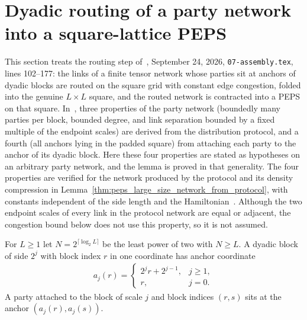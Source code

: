 \section{Dyadic routing of a party network into a square-lattice PEPS}
\label{sec:peps_dyadic_routing}
This section treats the routing step of~\cite[Lemma~8.2]{OpenAI2026PolynomialPEPS}, September 24, 2026,
\texttt{07-assembly.tex}, lines 102--177: the links of a finite tensor network
whose parties sit at anchors of dyadic blocks are routed on the square grid with
constant edge congestion, folded into the genuine $L\times L$ square, and the
routed network is contracted into a PEPS on that square. In~\cite[Proposition~7.1]{OpenAI2026PolynomialPEPS},
three properties of the party network (boundedly many parties per block,
bounded degree, and link separation bounded by a fixed multiple of the endpoint
scales) are derived from the distribution protocol, and a fourth (all anchors lying
in the padded square) from attaching each party to the anchor of its dyadic
block. Here these four properties are stated as hypotheses
on an arbitrary party network, and the lemma is proved in that generality. The
four properties are verified for the network produced by the protocol and its
density compression in
Lemma~\ref{thm:peps_large_size_network_from_protocol}, with constants
independent of the side length and the
Hamiltonian~\cite{gap:polypeps_routing_network_bounds}.
Although the two endpoint scales of every link in the protocol network
are equal or adjacent, the congestion bound below does not use this property, so it is
not assumed.

\begin{definition}
    \label{def:peps_dyadic_anchor}
    \leanok
    For $L\ge1$ let $N=2^{\lceil\log_2L\rceil}$ be the least power of two with
    $N\ge L$. A dyadic block of side $2^j$ with block index $r$ in one coordinate
    has anchor coordinate
    \begin{align}
        a_j(r)=\begin{cases}2^jr+2^{j-1},&j\ge1,\\ r,&j=0.\end{cases}
        \label{eq:peps_dyadic_anchor}
    \end{align}
    A party attached to the block of scale $j$ and block indices $(r,s)$ sits at
    the anchor $(a_j(r),a_j(s))$.
\end{definition}

